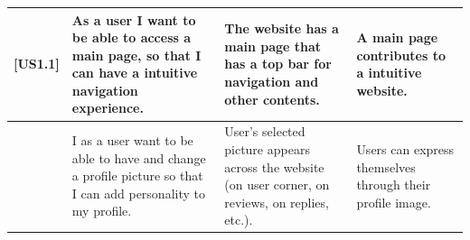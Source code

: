 \documentclass{article}
\begin{document}
\begin{longtable}{|p{1cm}|p{3cm}|p{6cm}|p{6cm}|}
[US1.1] & As a user I want to be able to access a main page, so that I can have a intuitive navigation experience. & The website has a main page that has a top bar for navigation and other contents. & A main page contributes to a intuitive website. \\ \hline
[US9.2] & I as a user want to be able to have and change a profile picture so that I can add personality to my profile. & User's selected picture appears across the website (on user corner, on reviews, on replies, etc.). & Users can express themselves through their profile image. \\ \hline

\end{longtable}
\end{document}
